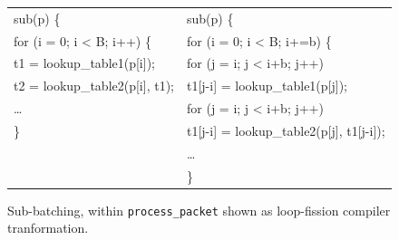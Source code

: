 \begin{figure}[ht]
\begin{small}
\begin{tabular}[b]{l|l}
sub\hspace{0.2cm}{\bf process\_packet}(p) \{ & sub\hspace{0.2cm}{\bf process\_packet}(p) \{\\
\hspace{0.3cm}for (i = 0; i < B; i++) \{ &\hspace{0.3cm}for (i = 0; i < B; i+=b) \{\\
\hspace{0.3cm}t1 = lookup\_table1(p[i]); &\hspace{0.3cm}for (j = i; j < i+b; j++)\\
\hspace{0.3cm}t2 = lookup\_table2(p[i], t1); & \hspace{0.6cm}t1[j-i] = lookup\_table1(p[j]);\\
\hspace{0.3cm}\ldots &\hspace{0.3cm}for (j = i; j < i+b; j++)\\
\} & \hspace{0.6cm}t1[j-i] = lookup\_table2(p[j], t1[j-i]);\\
&\hspace{0.3cm}\ldots\\
&\}\\
\end{tabular}
\end{small}
\caption{\label{fig:loop_fission_subbatch} Sub-batching, within {\tt process\_packet} shown as loop-fission compiler tranformation.}
\end{figure}




